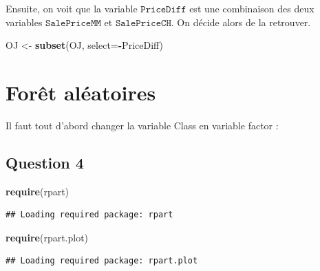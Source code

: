 \documentclass[
]{article}
\newenvironment{Shaded}{\begin{snugshade}}{\end{snugshade}}
\newcommand{\DataTypeTok}[1]{\textcolor[rgb]{0.13,0.29,0.53}{#1}}
\newcommand{\KeywordTok}[1]{\textcolor[rgb]{0.13,0.29,0.53}{\textbf{#1}}}
\newcommand{\NormalTok}[1]{#1}
\newcommand{\OperatorTok}[1]{\textcolor[rgb]{0.81,0.36,0.00}{\textbf{#1}}}
\newcommand{\StringTok}[1]{\textcolor[rgb]{0.31,0.60,0.02}{#1}}
\begin{document}
Ensuite, on voit que la variable \(\texttt{PriceDiff}\) est une
combinaison des deux variables \(\texttt{SalePriceMM}\) et
\(\texttt{SalePriceCH}\). On décide alors de la retrouver.

\begin{Shaded}
\begin{Highlighting}[]
\NormalTok{OJ <-}\StringTok{ }\KeywordTok{subset}\NormalTok{(OJ, }\DataTypeTok{select=}\OperatorTok{-}\NormalTok{PriceDiff)}
\end{Highlighting}
\end{Shaded}

\hypertarget{foruxeat-aluxe9atoires}{%
\section{Forêt aléatoires}\label{foruxeat-aluxe9atoires}}

Il faut tout d'abord changer la variable Class en variable factor :

\begin{Shaded}
\end{Shaded}

\hypertarget{question-4}{%
\subsection{Question 4}\label{question-4}}

\begin{Shaded}
\begin{Highlighting}[]
\KeywordTok{require}\NormalTok{(rpart)}
\end{Highlighting}
\end{Shaded}

\begin{verbatim}
## Loading required package: rpart
\end{verbatim}

\begin{Shaded}
\begin{Highlighting}[]
\KeywordTok{require}\NormalTok{(rpart.plot)}
\end{Highlighting}
\end{Shaded}

\begin{verbatim}
## Loading required package: rpart.plot
\end{verbatim}
\end{document}
